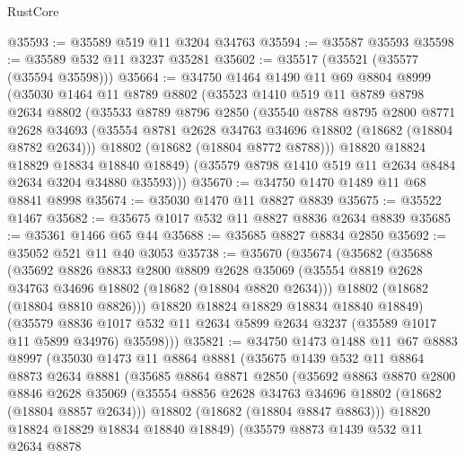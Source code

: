 \begin{lexlean}{RustCore}
\begin{coremodule}
@35593 := @35589 @519 @11 @3204 @34763
@35594 := @35587 @35593
@35598 := @35589 @532 @11 @3237 @35281
@35602 := @35517 (@35521 (@35577 (@35594 @35598)))
@35664 := @34750
    @1464
    @1490
    @11
    @69
    @8804
    @8999
    (@35030
      @1464
      @11
      @8789
      @8802
      (@35523
        @1410
        @519
        @11
        @8789
        @8798
        @2634
        @8802
        (@35533
          @8789
          @8796
          @2850
          (@35540
            @8788
            @8795
            @2800
            @8771
            @2628
            @34693
            (@35554 @8781 @2628 @34763 @34696 @18802 (@18682 (@18804 @8782 @2634)))
            @18802
            (@18682 (@18804 @8772 @8788)))
          @18820
          @18824
          @18829
          @18834
          @18840
          @18849)
        (@35579 @8798 @1410 @519 @11 @2634 @8484 @2634 @3204 @34880 @35593)))
@35670 := @34750 @1470 @1489 @11 @68 @8841 @8998
@35674 := @35030 @1470 @11 @8827 @8839
@35675 := @35522 @1467
@35682 := @35675 @1017 @532 @11 @8827 @8836 @2634 @8839
@35685 := @35361 @1466 @65 @44
@35688 := @35685 @8827 @8834 @2850
@35692 := @35052 @521 @11 @40 @3053
@35738 := @35670
    (@35674
      (@35682
        (@35688
          (@35692
            @8826
            @8833
            @2800
            @8809
            @2628
            @35069
            (@35554 @8819 @2628 @34763 @34696 @18802 (@18682 (@18804 @8820 @2634)))
            @18802
            (@18682 (@18804 @8810 @8826)))
          @18820
          @18824
          @18829
          @18834
          @18840
          @18849)
        (@35579
          @8836
          @1017
          @532
          @11
          @2634
          @5899
          @2634
          @3237
          (@35589 @1017 @11 @5899 @34976)
          @35598)))
@35821 := @34750
    @1473
    @1488
    @11
    @67
    @8883
    @8997
    (@35030
      @1473
      @11
      @8864
      @8881
      (@35675
        @1439
        @532
        @11
        @8864
        @8873
        @2634
        @8881
        (@35685
          @8864
          @8871
          @2850
          (@35692
            @8863
            @8870
            @2800
            @8846
            @2628
            @35069
            (@35554 @8856 @2628 @34763 @34696 @18802 (@18682 (@18804 @8857 @2634)))
            @18802
            (@18682 (@18804 @8847 @8863)))
          @18820
          @18824
          @18829
          @18834
          @18840
          @18849)
        (@35579
          @8873
          @1439
          @532
          @11
          @2634
          @8878

\end{coremodule}
\end{lexlean}
